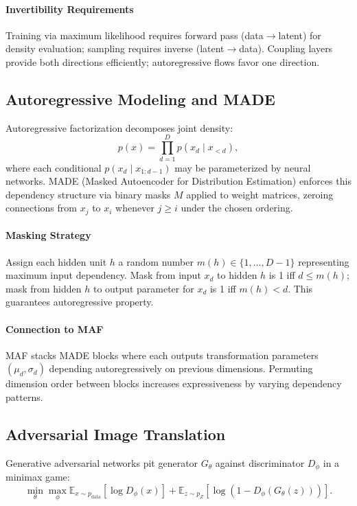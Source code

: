 \documentclass[conference]{IEEEtran}
\begin{document}
\paragraph{Invertibility Requirements} Training via maximum likelihood requires forward pass (data$\to$latent) for density evaluation; sampling requires inverse (latent$\to$data). Coupling layers provide both directions efficiently; autoregressive flows favor one direction.

\subsection{Autoregressive Modeling and MADE}
Autoregressive factorization decomposes joint density:
\begin{equation}
p(x) = \prod_{d=1}^{D} p(x_d \mid x_{<d}),
\end{equation}
where each conditional $p(x_d \mid x_{1:d-1})$ may be parameterized by neural networks. MADE (Masked Autoencoder for Distribution Estimation) enforces this dependency structure via binary masks $M$ applied to weight matrices, zeroing connections from $x_j$ to $x_i$ whenever $j \geq i$ under the chosen ordering.

\paragraph{Masking Strategy} Assign each hidden unit $h$ a random number $m(h) \in \{1, \dots, D-1\}$ representing maximum input dependency. Mask from input $x_d$ to hidden $h$ is 1 iff $d \leq m(h)$; mask from hidden $h$ to output parameter for $x_d$ is 1 iff $m(h) < d$. This guarantees autoregressive property.

\paragraph{Connection to MAF} MAF stacks MADE blocks where each outputs transformation parameters $(\mu_d, \sigma_d)$ depending autoregressively on previous dimensions. Permuting dimension order between blocks increases expressiveness by varying dependency patterns.

\subsection{Adversarial Image Translation}
Generative adversarial networks pit generator $G_{\theta}$ against discriminator $D_{\phi}$ in a minimax game:
\begin{equation}
\min_{\theta} \max_{\phi} \mathbb{E}_{x \sim p_{\text{data}}}[\log D_{\phi}(x)] + \mathbb{E}_{z \sim p_Z}[\log(1 - D_{\phi}(G_{\theta}(z)))].
\end{equation}
\end{document}
